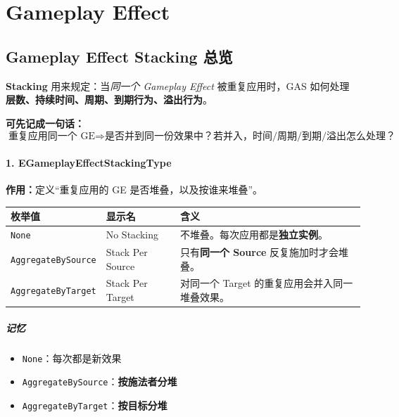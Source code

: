 \documentclass[CJKmath=true,10pt]{MyBook}
\begin{document}
\noindent

\mainmatter


\chapter{Gameplay Effect}


\section{Gameplay Effect Stacking 总览}

\textbf{Stacking} 用来规定：当\emph{同一个 Gameplay Effect} 被重复应用时，GAS 如何处理
\textbf{层数、持续时间、周期、到期行为、溢出行为}。

\vspace{0.5em}
\textbf{可先记成一句话：}
\[
\boxed{
	\text{重复应用同一个 GE} \Rightarrow
	\text{是否并到同一份效果中？若并入，时间/周期/到期/溢出怎么处理？}
}
\]

\subsubsection{1. EGameplayEffectStackingType}

\textbf{作用：}定义“重复应用的 GE 是否堆叠，以及按谁来堆叠”。

\begin{longtable}{@{}p{}p{}p{}@{}}
	\toprule
	\textbf{枚举值} & \textbf{显示名} & \textbf{含义} \\
	\midrule
	\endhead
	
	\texttt{None}
	& No Stacking
	& 不堆叠。每次应用都是\textbf{独立实例}。 \\
	
	\texttt{AggregateBySource}
	& Stack Per Source
	& 只有\textbf{同一个 Source} 反复施加时才会堆叠。 \\
	
	\texttt{AggregateByTarget}
	& Stack Per Target
	& 对同一个 Target 的重复应用会并入同一堆叠效果。 \\
	
	\bottomrule
\end{longtable}

\paragraph{记忆}
\begin{itemize}
	\item \texttt{None}：每次都是新效果
	\item \texttt{AggregateBySource}：\textbf{按施法者分堆}
	\item \texttt{AggregateByTarget}：\textbf{按目标分堆}
\end{itemize}
\end{document}
